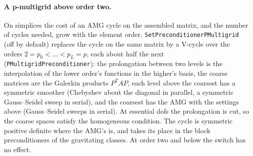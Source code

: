 \documentclass[11pt]{article}
\numberwithin{equation}{section}
\theoremstyle{remark}
\newcommand{\code}[1]{\texttt{#1}}
\begin{document}
\paragraph{A p-multigrid above order two.} On simplices the cost of an AMG
cycle on the assembled matrix, and the number of cycles needed, grow with
the element order. \code{SetPreconditionerPMultigrid} (off by default)
replaces the cycle on the same matrix by a V-cycle over the orders
$2 = p_0 < \dots < p_L = p$, each about half the next
(\code{PMultigridPreconditioner}): the prolongation between two levels is
the interpolation of the lower order's functions in the higher's basis,
the coarse matrices are the Galerkin products $P^TAP$, each level above the
coarsest has a symmetric smoother (Chebyshev about the diagonal in
parallel, a symmetric Gauss--Seidel sweep in serial), and the coarsest has
the AMG with the settings above (Gauss--Seidel sweeps in serial). At
essential dofs the prolongation is cut, so the coarse spaces satisfy the
homogeneous condition. The cycle is symmetric positive definite where the
AMG's is, and takes its place in the block preconditioners of the
gravitating classes. At order two and below the switch has no effect.
\end{document}
